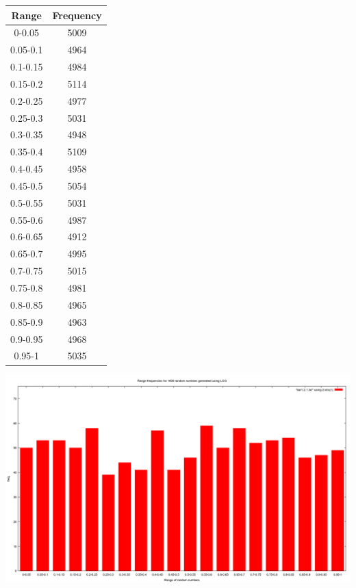 \documentclass{article}
\begin{document}
\begin{table}
{ \begin{tabular}{||c | c||}  \hline
		Range & Frequency \\ [0.5ex] \hline \hline0-0.05 & 5009\\
		\hline 
		0.05-0.1 & 4964\\
		\hline 
		0.1-0.15 & 4984\\
		\hline 
		0.15-0.2 & 5114\\
		\hline 
		0.2-0.25 & 4977\\
		\hline 
		0.25-0.3 & 5031\\
		\hline 
		0.3-0.35 & 4948\\
		\hline 
		0.35-0.4 & 5109\\
		\hline 
		0.4-0.45 & 4958\\
		\hline 
		0.45-0.5 & 5054\\
		\hline 
		0.5-0.55 & 5031\\
		\hline 
		0.55-0.6 & 4987\\
		\hline 
		0.6-0.65 & 4912\\
		\hline 
		0.65-0.7 & 4995\\
		\hline 
		0.7-0.75 & 5015\\
		\hline 
		0.75-0.8 & 4981\\
		\hline 
		0.8-0.85 & 4965\\
		\hline 
		0.85-0.9 & 4963\\
		\hline 
		0.9-0.95 & 4968\\
		\hline 
		0.95-1 & 5035\\
		\hline 
	\end{tabular} 
}
\end{table}

\includegraphics[scale=0.3]{"bar1_2_1"}
\end{document}
